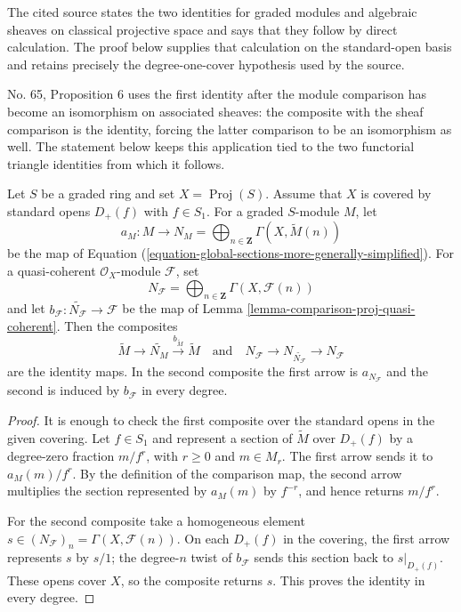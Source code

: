 \begin{lemma}
\label{lemma-comparison-proj-triangle-identities}
\begin{reference}
\cite[Chapter III, \S 2, no. 59, Propositions 7 and 8,
p. 252]{FAC}
\cite[Chapter III, \S 3, no. 65, Proposition 6 and proof,
p. 258]{FAC}
\end{reference}
\begin{history}
The cited source states the two identities for graded modules and
algebraic sheaves on classical projective space and says that they follow
by direct calculation. The proof below supplies that calculation on the
standard-open basis and retains precisely the degree-one-cover hypothesis
used by the source.

No. 65, Proposition 6 uses the first identity after the module comparison
has become an isomorphism on associated sheaves: the composite with the
sheaf comparison is the identity, forcing the latter comparison to be an
isomorphism as well. The statement below keeps this application tied to the
two functorial triangle identities from which it follows.
\end{history}
Let $S$ be a graded ring and set $X=\operatorname{Proj}(S)$. Assume that
$X$ is covered by standard opens $D_{+}(f)$ with $f \in S_1$.
For a graded $S$-module $M$, let
$$
a_M:M\longrightarrow
N_M=\bigoplus_{n\in\mathbf{Z}}\Gamma(X,\widetilde M(n))
$$
be the map of Equation
(\ref{equation-global-sections-more-generally-simplified}).
For a quasi-coherent $\mathcal{O}_X$-module $\mathcal{F}$, set
$$
N_{\mathcal{F}}=
\bigoplus_{n\in\mathbf{Z}}\Gamma(X,\mathcal{F}(n))
$$
and let $b_{\mathcal{F}}:\widetilde{N_{\mathcal{F}}}\to\mathcal{F}$
be the map of Lemma \ref{lemma-comparison-proj-quasi-coherent}. Then
the composites
$$
\widetilde M\longrightarrow\widetilde{N_M}
\xrightarrow{b_{\widetilde M}}\widetilde M
\quad\text{and}\quad
N_{\mathcal{F}}\longrightarrow
N_{\widetilde{N_{\mathcal{F}}}}\longrightarrow N_{\mathcal{F}}
$$
are the identity maps. In the second composite the first arrow is
$a_{N_{\mathcal{F}}}$ and the second is induced by
$b_{\mathcal{F}}$ in every degree.
\end{lemma}

\begin{proof}
It is enough to check the first composite over the standard opens in the
given covering. Let $f\in S_1$ and represent a section of $\widetilde M$
over $D_{+}(f)$ by a degree-zero fraction $m/f^r$, with $r\geq 0$ and
$m\in M_r$.
The first arrow sends it to $a_M(m)/f^r$. By the definition of the
comparison map, the second arrow multiplies the section represented by
$a_M(m)$ by $f^{-r}$, and hence returns $m/f^r$.

For the second composite take a homogeneous element
$s\in (N_{\mathcal{F}})_n=\Gamma(X,\mathcal{F}(n))$. On each
$D_{+}(f)$ in the covering, the first arrow represents $s$ by $s/1$;
the degree-$n$ twist of $b_{\mathcal{F}}$ sends this section back to
$s|_{D_{+}(f)}$. These opens cover $X$, so the composite returns $s$.
This proves the identity in every degree.
\end{proof}

